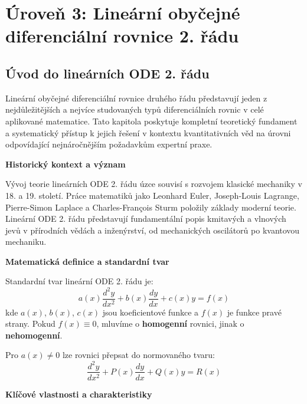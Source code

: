 \section{Úroveň 3: Lineární obyčejné diferenciální rovnice 2. řádu}
\label{sec:linearni-ode-2-rad}

\subsection{Úvod do lineárních ODE 2. řádu}

\label{subsec:uvod-linearni-ode-2}

Lineární obyčejné diferenciální rovnice druhého řádu představují jeden z nejdůležitějších a nejvíce studovaných typů diferenciálních rovnic v celé aplikované matematice. Tato kapitola poskytuje kompletní teoretický fundament a systematický přístup k jejich řešení v kontextu kvantitativních věd na úrovni odpovídající nejnáročnějším požadavkům expertní praxe.

\vspace{1\baselineskip}

\noindent\textbf{Historický kontext a význam}

Vývoj teorie lineárních ODE 2. řádu úzce souvisí s rozvojem klasické mechaniky v 18. a 19. století. Práce matematiků jako Leonhard Euler, Joseph-Louis Lagrange, Pierre-Simon Laplace a Charles-François Sturm položily základy moderní teorie. Lineární ODE 2. řádu představují fundamentální popis kmitavých a vlnových jevů v přírodních vědách a inženýrství, od mechanických oscilátorů po kvantovou mechaniku.

\vspace{1\baselineskip}

\noindent\textbf{Matematická definice a standardní tvar}

Standardní tvar lineární ODE 2. řádu je:
\[
a(x)\frac{d^2y}{dx^2} + b(x)\frac{dy}{dx} + c(x)y = f(x)
\]
kde $a(x)$, $b(x)$, $c(x)$ jsou koeficientové funkce a $f(x)$ je funkce pravé strany. Pokud $f(x) \equiv 0$, mluvíme o \textbf{homogenní} rovnici, jinak o \textbf{nehomogenní}. 

Pro $a(x) \neq 0$ lze rovnici přepsat do normovaného tvaru:
\[
\frac{d^2y}{dx^2} + P(x)\frac{dy}{dx} + Q(x)y = R(x)
\]

\vspace{1\baselineskip}

\noindent\textbf{Klíčové vlastnosti a charakteristiky}

